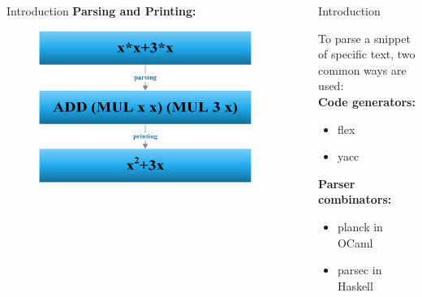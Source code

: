 \documentclass[final]{beamer}
\newlength{\sepwid}
\newlength{\onecolwid}
\newlength{\twocolwid}
\begin{document}
\begin{frame}[t]
\begin{columns}[t]
\begin{column}{\onecolwid}
\begin{block}{Introduction}
\textbf{Parsing and Printing:}

\begin{figure}
\includegraphics[width=0.75\linewidth]{img/parseprintershort.jpg}

\end{figure}


\end{block}


\end{column} %

\begin{column}{\sepwid}\end{column} %

\begin{column}{\twocolwid} %

\begin{columns}[t,totalwidth=\twocolwid] %

\begin{column}{\onecolwid}\vspace{-.6in} %


\begin{block}{Introduction}

To parse a snippet of specific text, two common ways are used: \\
\textbf{Code generators:}
\begin{itemize}
\item flex
\item yacc
\end{itemize}
\textbf{Parser combinators:}
\begin{itemize}
\item planck in OCaml
\item parsec in Haskell
\end{itemize}


\end{block}
\end{column}
\end{columns}
\end{column}
\end{columns}
\end{frame}
\end{document}
